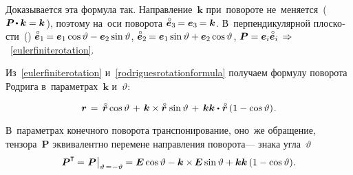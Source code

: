 \begin{otherlanguage}{russian}
\vspace{-0.1em} Доказывается эта формула так. Направление~${\bm{k}}$ при~повороте не~меняется~(${\bm{P} \hspace{-0.2ex}\dotp \bm{k} = \bm{k}\hspace{.12ex}}$), поэтому на~оси поворота ${\mathcircabove{\bm{e}}_3 \hspace{-0.16ex} = \bm{e}_3 \hspace{-0.16ex} = \bm{k}}$. В~перпендикулярной плоскости~() ${\mathcircabove{\bm{e}}_1 \hspace{-0.16ex} = \bm{e}_1 \operatorname{cos} \vartheta - \bm{e}_2 \operatorname{sin} \vartheta}$, ${\mathcircabove{\bm{e}}_2 \hspace{-0.16ex} = \bm{e}_1 \operatorname{sin} \vartheta + \bm{e}_2 \operatorname{cos} \vartheta}$, ${\bm{P} = \bm{e}_i \mathcircabove{\bm{e}}_i \,\Rightarrow\hspace{.2ex}}$~\eqref{eulerfiniterotation}.



Из~\eqref{eulerfiniterotation} и~\eqref{rodriguesrotationformula} получаем формулу поворота Родрига в~параметрах~$\bm{k}$ и~$\vartheta$:

\nopagebreak\vspace{-0.3em}\begin{equation*}
\bm{r} \hspace{.3ex}=\hspace{.4ex} \mathcircabove{\bm{r}} \operatorname{cos} \vartheta \hspace{.3ex}+\hspace{.3ex} \bm{k} \times \mathcircabove{\bm{r}} \hspace{.2ex} \operatorname{sin} \vartheta \hspace{.3ex}+\hspace{.4ex} \bm{k} \bm{k} \dotp \hspace{.1ex} \mathcircabove{\bm{r}} \left({1 - \operatorname{cos} \vartheta}\right) \hspace{-0.25ex}.
\end{equation*}

\vspace{-0.16em} В~параметрах конечного поворота транспонирование, оно~же обращение, тензора~$\bm{P}$ эквивалентно перемене направления поворота\:--- знака угла~$\vartheta$
\[
\bm{P}^{\T} \hspace{-0.1ex}=\hspace{.1ex} \bm{P} \hspace{.1ex} \bigr|_{\vartheta \,=\hspace{.1ex} -\vartheta} \hspace{-0.1ex} = \bm{E} \operatorname{cos} \vartheta - \bm{k} \times\hspace{-0.2ex} \bm{E} \operatorname{sin} \vartheta + \bm{k} \bm{k} \left({1 - \operatorname{cos} \vartheta}\right) \hspace{-0.32ex}.
\]


\end{otherlanguage}
